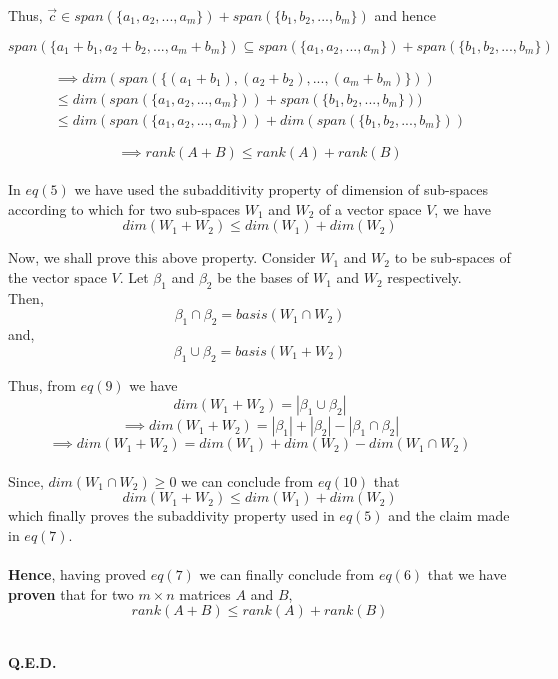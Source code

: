 \documentclass{article}
\begin{document}
Thus, $\Vec{c} \in span(\{a_1, a_2, ..., a_m\}) + span(\{b_1, b_2, ..., b_m\})$ and hence

\[
span(\{a_1+b_1, a_2+b_2, ..., a_m+b_m\})
\subseteq span(\{a_1, a_2, ..., a_m\}) + span(\{b_1, b_2, ..., b_m\})
\]

\begin{center}
\begin{multline}
\implies  dim(span(\{(a_1+b_1), (a_2+b_2), ..., (a_m+b_m)\}))\\
\leq dim(span(\{a_1, a_2, ...,a_m\})) + span(\{b_1, b_2, ...,b_m\}))\\ 
\leq dim(span(\{a_1, a_2, ..., a_m\})) + dim(span(\{b_1, b_2, ..., b_m\})) \tag{5} 
\end{multline}
\end{center}

\[
\implies rank(A+B) \leq rank(A) + rank(B) \tag{6}
\]\\

In $eq(5)$ we have used the subadditivity property of dimension of sub-spaces according to which for two sub-spaces $W_1$ and $W_2$ of a vector space $V$, we have \[dim(W_1+W_2) \leq dim(W_1)+dim(W_2) \tag{7}\]

Now, we shall prove this above property.
Consider $W_1$ and $W_2$ to be sub-spaces of the vector space $V$. Let $\beta_1$ and $\beta_2$ be the bases of $W_1$ and $W_2$ respectively.\\

Then,
\[\beta_1 \cap \beta_2 = basis(W_1 \cap W_2) \tag{8}\]
and,
\[\beta_1 \cup \beta_2 = basis(W_1 + W_2) \tag{9}\]

Thus, from $eq(9)$ we have
\[dim(W_1+W_2) = |\beta_1 \cup \beta_2|\]
\[\implies dim(W_1+W_2) = |\beta_1| + |\beta_2| - |\beta_1 \cap \beta_2|\]
\[\implies dim(W_1+W_2) = dim(W_1) + dim(W_2) - dim(W_1 \cap W_2) \tag{10}\]\\

Since, $ dim(W_1 \cap W_2) \geq 0$ we can conclude from $eq(10)$ that
\[dim(W_1+W_2) \leq dim(W_1) + dim(W_2) \tag{11}\]
which finally proves the subaddivity property used in $eq(5)$ and the claim made in $eq(7)$.\\ \\

\textbf{Hence}, having proved $eq(7)$ we can finally conclude from $eq(6)$ that we have \textbf{proven} that for two $m \times n$ matrices $A$ and $B$,  $$rank(A + B) \leq rank(A) + rank(B)$$\\

\begin{center}
    \textbf{Q.E.D.}
\end{center}
\end{document}
